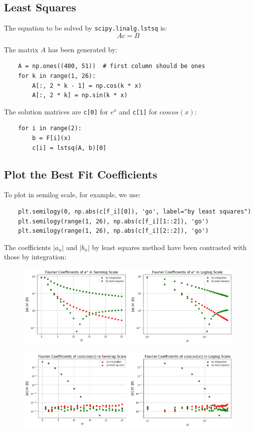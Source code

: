 \documentclass[12pt, a4paper]{article}
\newcommand{\code}{\lstinline[basicstyle=\small]}
\begin{document}
\subsection{Least Squares}
The equation to be solved by \code{scipy.linalg.lstsq} is:
\begin{equation*}
    Ac = B
\end{equation*}

The matrix $A$ has been generated by:
\begin{lstlisting}
    A = np.ones((400, 51))  # first column should be ones
    for k in range(1, 26):
        A[:, 2 * k - 1] = np.cos(k * x)
        A[:, 2 * k] = np.sin(k * x)
\end{lstlisting}

The solution matrices are \code{c[0]} for $e^x$ and
\code{c[1]} for $coscos(x)$:
\begin{lstlisting}
    for i in range(2):
        b = F[i](x)
        c[i] = lstsq(A, b)[0]
\end{lstlisting}


\subsection{Plot the Best Fit Coefficients}
To plot in semilog scale, for example, we use:
\begin{lstlisting}
    plt.semilogy(0, np.abs(c[f_i][0]), 'go', label="by least squares")
    plt.semilogy(range(1, 26), np.abs(c[f_i][1::2]), 'go')
    plt.semilogy(range(1, 26), np.abs(c[f_i][2::2]), 'go')
\end{lstlisting}

The coefficients $|a_n|$ and $|b_n|$ by least squares method have been contrasted with
those by integration:
\begin{figure}[H]
    \centering
    \includegraphics[scale=0.39]{5a.png}
\end{figure}
\begin{figure}[H]
    \centering
    \includegraphics[scale=0.39]{5b.png}
\end{figure}
\end{document}
